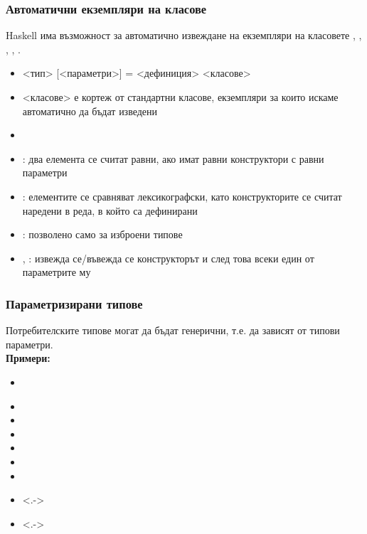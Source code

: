 \documentclass[alsotrans]{beamerswitch}
\begin{document}
\begin{frame}[fragile]
  \frametitle{Автоматични екземпляри на класове}

  Haskell има възможност за автоматично извеждане на екземпляри на класовете , , , , .\pause
  \small
  \begin{itemize}[<+->]
  \item {} <тип> [<параметри>] \tta= <дефиниция>  <класове>
  \item{} <класове> е кортеж от стандартни класове, екземпляри за които искаме автоматично да бъдат изведени
  \item {}\\
    \hspace{10ex}
  \item {}: два елемента се считат равни, ако имат равни конструктори с равни параметри
  \item {}: елементите се сравняват лексикографски, като конструкторите се считат наредени в реда, в който са дефинирани
  \item {}: позволено само за изброени типове
  \item {}, : извежда се/въвежда се конструкторът и след това всеки един от параметрите му
  \end{itemize}
\end{frame}

\begin{frame}
  \frametitle{Параметризирани типове}
  Потребителските типове могат да бъдат \alert{генерични}, т.е. да зависят от типови параметри.\\
  \pause
  \textbf{Примери:}
  \begin{itemize}[<+->]
  \item {}\\
      \hspace{10ex}
  \item {}
  \item {}
  \item {}
  \item {}
  \item {}
  \item {}
  \item<.-> 
  \item<.-> 
  \end{itemize}
\end{frame}
\end{document}
